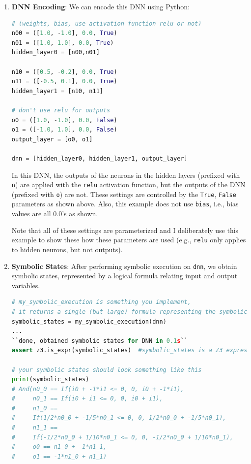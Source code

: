 \documentclass[oneside,11pt,dvipsnames]{book}
\numberwithin{equation}{section}
\theoremstyle{definition}
\theoremstyle{remark}
\begin{document}
\begin{enumerate}[label=\arabic*.]
\item \textbf{DNN Encoding}: We can encode this DNN using Python:

\begin{lstlisting}[language=Python]
# (weights, bias, use activation function relu or not)
n00 = ([1.0, -1.0], 0.0, True)
n01 = ([1.0, 1.0], 0.0, True)
hidden_layer0 = [n00,n01]

n10 = ([0.5, -0.2], 0.0, True)
n11 = ([-0.5, 0.1], 0.0, True)
hidden_layer1 = [n10, n11]

# don't use relu for outputs
o0 = ([1.0, -1.0], 0.0, False)  
o1 = ([-1.0, 1.0], 0.0, False)
output_layer = [o0, o1]

dnn = [hidden_layer0, hidden_layer1, output_layer]
\end{lstlisting}

In this DNN, the outputs of the neurons in the hidden layers (prefixed with \texttt{n}) are applied with the \texttt{relu} activation function, but the outputs of the DNN (prefixed with \texttt{o}) are not.  These settings are controlled by the \texttt{True}, \texttt{False} parameters as shown above.  Also, this example does not use \texttt{bias}, i.e., bias values are all 0.0's as shown. 

Note that all of these settings are parameterized and I deliberately use this example to show these how these parameters are used (e.g., \texttt{relu} only applies to hidden neurons, but not outputs).

\item \textbf{Symbolic States}: After performing symbolic execution on \texttt{dnn}, we obtain symbolic states, represented by a logical formula relating input and output variables.

\begin{lstlisting}[language=Python]
# my_symbolic_execution is something you implement,
# it returns a single (but large) formula representing the symbolic states.
symbolic_states = my_symbolic_execution(dnn)
...
``done, obtained symbolic states for DNN in 0.1s``
assert z3.is_expr(symbolic_states)  #symbolic_states is a Z3 expression

# your symbolic states should look something like this
print(symbolic_states)   
# And(n0_0 == If(i0 + -1*i1 <= 0, 0, i0 + -1*i1),
#     n0_1 == If(i0 + i1 <= 0, 0, i0 + i1),
#     n1_0 ==
#     If(1/2*n0_0 + -1/5*n0_1 <= 0, 0, 1/2*n0_0 + -1/5*n0_1),
#     n1_1 ==
#     If(-1/2*n0_0 + 1/10*n0_1 <= 0, 0, -1/2*n0_0 + 1/10*n0_1),
#     o0 == n1_0 + -1*n1_1,
#     o1 == -1*n1_0 + n1_1)
\end{lstlisting}


\end{enumerate}
\end{document}
